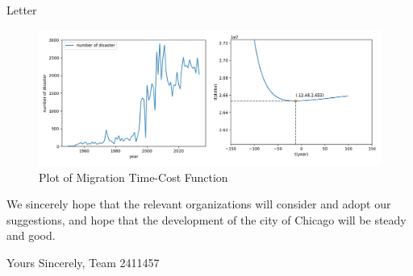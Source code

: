 \documentclass[12pt]{article}  %
\begin{document}
\begin{letter}{Letter}
\begin{figure}[htbp]
\centering
\includegraphics[width=.8\textwidth]{img/img07.png}
\caption{Plot of Migration Time-Cost Function}
\end{figure}

We sincerely hope that the relevant organizations will consider and adopt our suggestions, and hope that the development of the city of Chicago will be steady and good.

Yours Sincerely, Team 2411457

\end{letter}

\newpage
\end{document}
